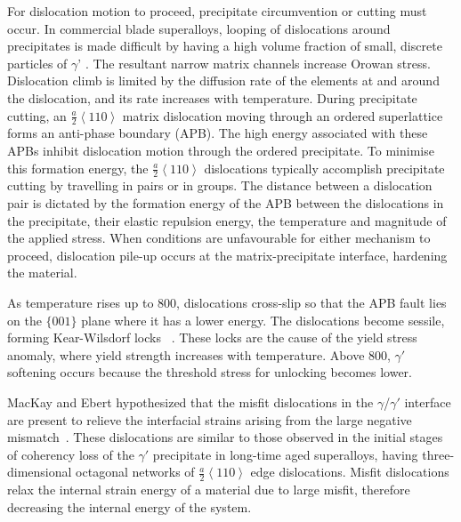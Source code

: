 For dislocation motion to proceed, precipitate circumvention or cutting must occur.  In commercial blade superalloys, looping of dislocations around precipitates is made difficult by having a high volume fraction of small, discrete particles of $\gamma$' \cite{reed06, copley67}.  The resultant narrow matrix channels increase Orowan stress.  Dislocation climb is limited by the diffusion rate of the elements at and around the dislocation, and its rate increases with temperature.  During precipitate cutting, an $\frac{a}{2}\left<110\right>$ matrix dislocation moving through an ordered superlattice forms an anti-phase boundary (APB).  The high energy associated with these APBs inhibit dislocation motion through the ordered precipitate.  To minimise this formation energy, the $\frac{a}{2}\left<110\right>$ dislocations typically accomplish precipitate cutting by travelling in pairs or in groups.  The distance between a dislocation pair is dictated by the formation energy of the APB between the dislocations in the precipitate, 
their elastic repulsion energy, the temperature and magnitude of the applied stress.  When conditions are unfavourable for either mechanism to proceed, dislocation pile-up occurs at the matrix-precipitate interface, hardening the material.


As temperature rises up to 800\celsius, dislocations cross-slip so that the APB fault lies on the $\{001\}$ plane where it has a lower energy.  The dislocations become sessile, forming Kear-Wilsdorf locks ~\cite{reed06}.  These locks are the cause of the yield stress anomaly, where yield strength increases with temperature.  Above 800\celsius, $\gamma'$ softening occurs because the threshold stress for unlocking becomes lower.

MacKay and Ebert hypothesized that the misfit dislocations in the $\gamma$/$\gamma'$  interface are present to relieve the interfacial strains arising from the large negative mismatch~\cite{mackay83}.  These dislocations are similar to those observed in the initial stages of coherency loss of the $\gamma'$ precipitate in long-time aged superalloys, having three-dimensional octagonal networks of $\frac{a}{2}\left<110\right>$ edge dislocations.  Misfit dislocations relax the internal strain energy of a material due to large misfit, therefore decreasing the internal energy of the system. 

